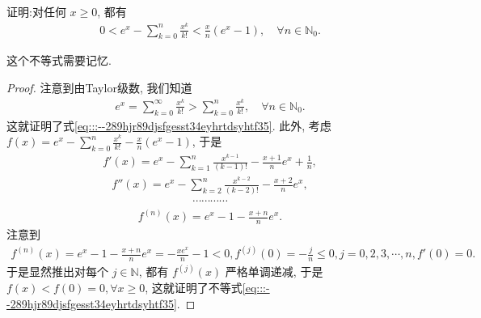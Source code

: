 \documentclass[../../main.tex]{subfiles}%
\begin{document}
\begin{proposition}\label{proposition:e^x的幂级数展开的放缩不等式}
证明:对任何 $x \geqslant 0$, 都有
\begin{align}
0 < e^x - \sum_{k=0}^n \frac{x^k}{k!} < \frac{x}{n}\left(e^x - 1\right), \quad \forall n \in \mathbb{N}_0. \label{eq:::--289hjr89djsfgesst34eyhrtdsyhtf35}
\end{align}
\end{proposition}
\begin{note}
这个不等式需要记忆.
\end{note}
\begin{proof}
注意到由Taylor级数, 我们知道
\begin{align*}
e^x = \sum_{k=0}^{\infty} \frac{x^k}{k!} > \sum_{k=0}^n \frac{x^k}{k!}, \quad \forall n \in \mathbb{N}_0.
\end{align*}
这就证明了式\eqref{eq:::--289hjr89djsfgesst34eyhrtdsyhtf35}. 此外, 考虑 $f(x) = e^x - \sum_{k=0}^n \frac{x^k}{k!} - \frac{x}{n}\left(e^x - 1\right)$, 于是
\begin{align*}
f'(x) = e^x - \sum_{k=1}^n \frac{x^{k-1}}{(k-1)!} - \frac{x+1}{n}e^x + \frac{1}{n},
\end{align*}
\begin{align*}
f''(x) = e^x - \sum_{k=2}^n \frac{x^{k-2}}{(k-2)!} - \frac{x+2}{n}e^x,
\end{align*}
\begin{align*}
\cdots \cdots \cdots \cdots 
\end{align*}
\begin{align*}
f^{(n)}(x) = e^x - 1 - \frac{x+n}{n}e^x.
\end{align*}
注意到
\begin{align*}
f^{(n)}(x) = e^x - 1 - \frac{x+n}{n}e^x = -\frac{xe^x}{n} - 1 < 0, f^{(j)}(0) = -\frac{j}{n} \leqslant 0, j=0,2,3,\cdots,n, f'(0)=0.
\end{align*}
于是显然推出对每个 $j \in \mathbb{N}$, 都有 $f^{(j)}(x)$ 严格单调递减, 于是 $f(x) < f(0)=0, \forall x \geqslant 0$, 这就证明了不等式\eqref{eq:::--289hjr89djsfgesst34eyhrtdsyhtf35}.
\end{proof}
\end{document}
